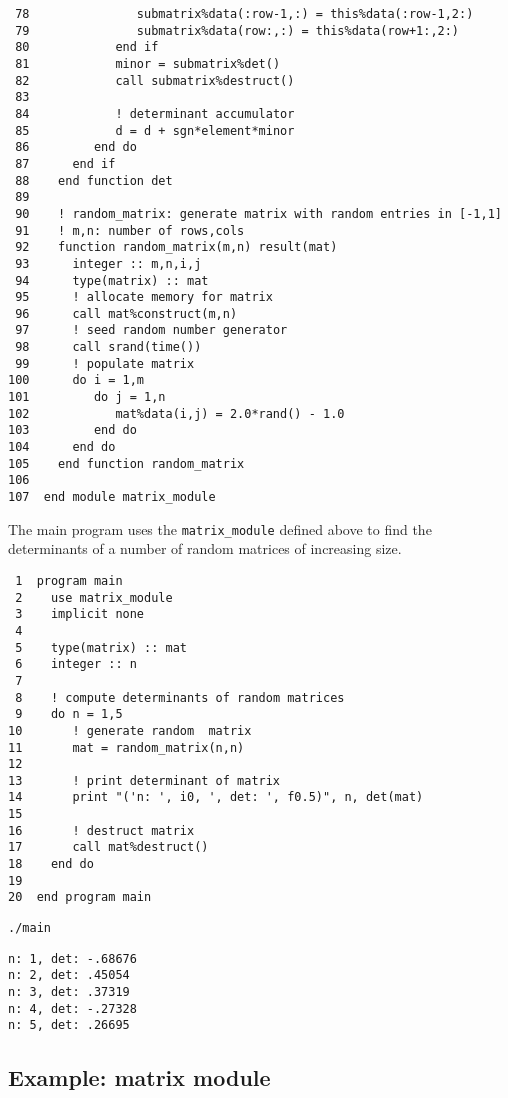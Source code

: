 \documentclass[11pt]{article}
\begin{document}
\begin{verbatim}
 78               submatrix%data(:row-1,:) = this%data(:row-1,2:)
 79               submatrix%data(row:,:) = this%data(row+1:,2:)
 80            end if
 81            minor = submatrix%det()
 82            call submatrix%destruct()
 83  
 84            ! determinant accumulator
 85            d = d + sgn*element*minor
 86         end do
 87      end if
 88    end function det
 89  
 90    ! random_matrix: generate matrix with random entries in [-1,1]
 91    ! m,n: number of rows,cols
 92    function random_matrix(m,n) result(mat)
 93      integer :: m,n,i,j
 94      type(matrix) :: mat
 95      ! allocate memory for matrix
 96      call mat%construct(m,n)
 97      ! seed random number generator
 98      call srand(time())
 99      ! populate matrix
100      do i = 1,m
101         do j = 1,n
102            mat%data(i,j) = 2.0*rand() - 1.0
103         end do
104      end do
105    end function random_matrix
106  
107  end module matrix_module
\end{verbatim}

The main program uses the \texttt{matrix\_module} defined above to find the determinants of a number of random matrices of increasing size. 

\begin{verbatim}
 1  program main
 2    use matrix_module
 3    implicit none
 4  
 5    type(matrix) :: mat
 6    integer :: n
 7  
 8    ! compute determinants of random matrices
 9    do n = 1,5
10       ! generate random  matrix
11       mat = random_matrix(n,n)
12  
13       ! print determinant of matrix
14       print "('n: ', i0, ', det: ', f0.5)", n, det(mat)
15  
16       ! destruct matrix
17       call mat%destruct()
18    end do
19  
20  end program main
\end{verbatim}

\begin{verbatim}
./main
\end{verbatim}

\begin{verbatim}
n: 1, det: -.68676
n: 2, det: .45054
n: 3, det: .37319
n: 4, det: -.27328
n: 5, det: .26695
\end{verbatim}

\subsection{Example: matrix module}
\label{sec:orgheadline55}
\end{document}

